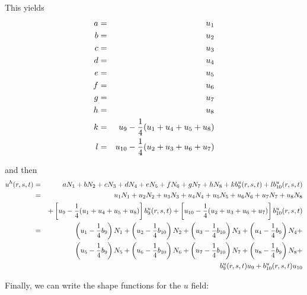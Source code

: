This yields
\begin{eqnarray}
a &=& u_1 \nonumber\\
b &=& u_2 \nonumber\\
c &=& u_3 \nonumber\\
d &=& u_4 \nonumber\\
e &=& u_5 \nonumber\\
f &=& u_6 \nonumber\\
g &=& u_7 \nonumber\\
h &=& u_8 \nonumber\\
k &=& u_9-\frac{1}{4}(u_1 + u_4 + u_5 + u_8) \nonumber\\
l &=& u_{10}-\frac{1}{4}(u_2 + u_3 + u_6 + u_7) \nonumber 
\end{eqnarray}

and then 
\begin{eqnarray}
u^h(r,s,t)  
&=& aN_1 + b N_2 + cN_3 +dN_4 + eN_5 + fN_6 + gN_7 + hN_8 
+ k b_9^u(r,s,t) + l b_{10}^u(r,s,t) \nonumber\\
&=& u_1N_1 + u_2 N_2 + u_3N_3 +u_4N_4 + u_5N_5 + u_6N_6 + u_7N_7 + u_8N_8 \nonumber\\
&& +
\left[u_9-\frac{1}{4}(u_1 + u_4 + u_5 + u_8)\right] b_9^u(r,s,t) +
\left[u_{10}-\frac{1}{4}(u_2 + u_3 + u_6 + u_7)\right] b_{10}^u(r,s,t) \nonumber\\
&=& 
\left(u_1-\frac{1}{4}b_9\right)N_1 +
\left(u_2-\frac{1}{4}b_{10}\right)N_2 +
\left(u_3-\frac{1}{4}b_{10}\right)N_3 +
\left(u_4-\frac{1}{4}b_9\right)N_4 + \nonumber\\
&&
\left(u_5-\frac{1}{4}b_9\right)N_5 +
\left(u_6-\frac{1}{4}b_{10}\right)N_6 +
\left(u_7-\frac{1}{4}b_{10}\right)N_7 +
\left(u_8-\frac{1}{4}b_9\right)N_8 + \nonumber\\
&& b_9^u(r,s,t) u_9+  b_{10}^u(r,s,t) u_{10} \nonumber
\end{eqnarray}

Finally, we can write the shape functions for the $u$ field:

